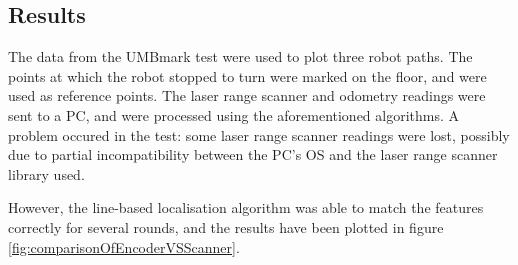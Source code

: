 \subsection{Results}
The data from the UMBmark test were used to plot three robot paths.
The points at which the robot stopped to turn were marked on the floor,
and were used as reference points.
The laser range scanner and odometry readings were sent to a PC,
and were processed using the aforementioned algorithms.
A problem occured in the test: some laser range scanner readings were lost,
possibly due to partial incompatibility between the PC's OS and the laser range scanner library used.

%



However, the line-based localisation algorithm was able to match the features correctly for several
rounds, and the results have been plotted in figure \ref{fig:comparisonOfEncoderVSScanner}.


